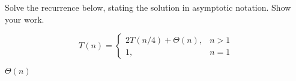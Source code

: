 \begin{prob}
    Solve the recurrence below, stating the solution in asymptotic notation. Show your work.

    \[
        T(n) =
        \begin{cases}
            2 T(n/4) + \Theta(n),& n > 1\\
            1,& n = 1
        \end{cases}
    \]

    \begin{soln}
        $\Theta(n)$
    \end{soln}

\end{prob}
